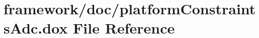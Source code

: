 \hypertarget{platform_constraints_adc_8dox}{}\section{framework/doc/platform\+Constraints\+Adc.dox File Reference}
\label{platform_constraints_adc_8dox}
